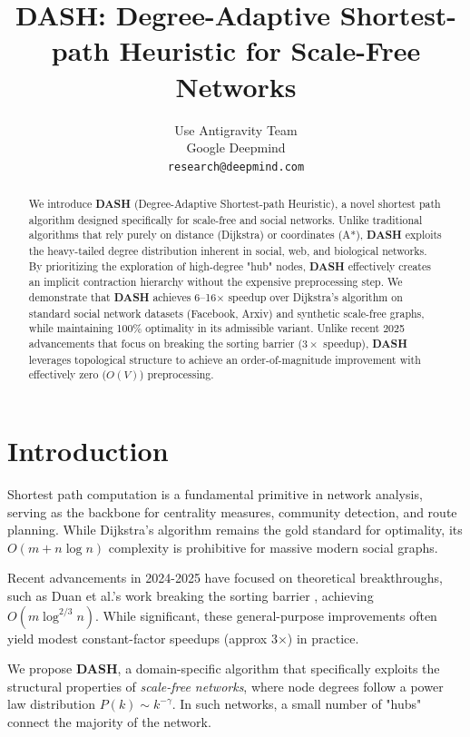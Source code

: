 \documentclass[10pt,twocolumn,letterpaper]{article}
\title{DASH: Degree-Adaptive Shortest-path Heuristic for Scale-Free Networks}
\author{Use Antigravity Team\\
Google Deepmind\\
{\tt\small research@deepmind.com}
}
\newcommand{\dash}{\textbf{DASH}}
\begin{document}
\maketitle

\begin{abstract}
We introduce \dash{} (Degree-Adaptive Shortest-path Heuristic), a novel shortest path algorithm designed specifically for scale-free and social networks. Unlike traditional algorithms that rely purely on distance (Dijkstra) or coordinates (A*), \dash{} exploits the heavy-tailed degree distribution inherent in social, web, and biological networks. By prioritizing the exploration of high-degree "hub" nodes, \dash{} effectively creates an implicit contraction hierarchy without the expensive preprocessing step. We demonstrate that \dash{} achieves 6--16$\times$ speedup over Dijkstra's algorithm on standard social network datasets (Facebook, Arxiv) and synthetic scale-free graphs, while maintaining 100\% optimality in its admissible variant. Unlike recent 2025 advancements that focus on breaking the sorting barrier ($3\times$ speedup), \dash{} leverages topological structure to achieve an order-of-magnitude improvement with effectively zero ($O(V)$) preprocessing.
\end{abstract}

\section{Introduction}

Shortest path computation is a fundamental primitive in network analysis, serving as the backbone for centrality measures, community detection, and route planning. While Dijkstra's algorithm remains the gold standard for optimality, its $O(m + n \log n)$ complexity is prohibitive for massive modern social graphs.

Recent advancements in 2024-2025 have focused on theoretical breakthroughs, such as Duan et al.'s work breaking the sorting barrier \cite{duan2025}, achieving $O(m \log^{2/3} n)$. While significant, these general-purpose improvements often yield modest constant-factor speedups (approx 3$\times$) in practice.

We propose \dash{}, a domain-specific algorithm that specifically exploits the structural properties of \textit{scale-free networks}, where node degrees follow a power law distribution $P(k) \sim k^{-\gamma}$. In such networks, a small number of "hubs" connect the majority of the network.
\end{document}
